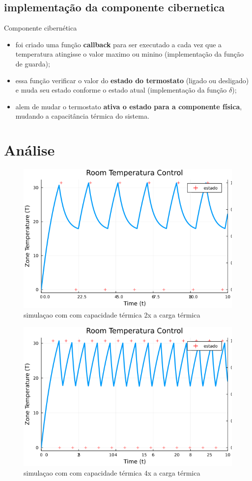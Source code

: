 \documentclass{beamer}
\begin{document}
\subsection{implementação da componente cibernetica}
\begin{frame}{Componente cibernética}
	\begin{itemize}
		\item foi criado uma função \textbf{callback} para ser executado a cada vez que a temperatura atingisse o valor maximo ou minino (implementação da função de guarda);
		\item essa função verificar o valor do \textbf{estado do termostato} (ligado ou desligado) e muda seu estado conforme o estado atual (implementação da função $\delta$);
		\item alem de mudar o termostato \textbf{ativa o estado para a componente física}, mudando a capacitância térmica do sistema.
	\end{itemize}
\end{frame}

\section{Análise}
\begin{frame}
	\begin{figure}
		\centering
		\includegraphics[width=.75\textwidth]{simulacao.png}
		\caption{simulaçao com com capacidade térmica 2x a carga térmica}
		\label{fig:simulacao}
	\end{figure}
\end{frame}

\begin{frame}
	\begin{figure}
		\centering
		\includegraphics[width=.75\textwidth]{simulacao_4x.png}
		\caption{simulaçao com com capacidade térmica 4x a carga térmica}
		\label{fig:simulacao2}
	\end{figure}
\end{frame}
\end{document}
